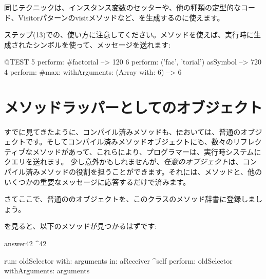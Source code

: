 \documentclass[a4paper,10pt,twoside]{book}
\begin{document}
同じテクニックは、インスタンス変数のセッターや、他の種類の定型的なコード、Visitorパターンのvisitメソッドなど、を生成するのに使えます。

ステップ(13)での、使い方に注意してください。メソッドを使えば、実行時に生成されたシンボルを使って、メッセージを送れます:
\begin{code}{@TEST}
5 perform: #factorial                                             --> 120
6 perform: ('fac', 'torial') asSymbol                       --> 720
4 perform: #max: withArguments: (Array with: 6) --> 6
\end{code}

\section{メソッドラッパーとしてのオブジェクト}

すでに見てきたように、コンパイル済みメソッドも、\st においては、普通のオブジェクトです。そしてコンパイル済みメソッドオブジェクトにも、数々のリフレクティブなメソッドがあって、これらにより、プログラマーは、実行時システムにクエリを送れます。
少し意外かもしれませんが、\emph{任意のオブジェクト}は、コンパイル済みメソッドの役割を担うことができます。それには、メソッドと、他のいくつかの重要なメッセージに応答するだけで済みます。 %


さてここで、普通の\st のオブジェクトを、このクラスのメソッド辞書に登録しましょう。


を見ると、以下のメソッドが見つかるはずです:
\begin{code}{}
answer42
	^42

run: oldSelector with: arguments in: aReceiver
	^self perform: oldSelector withArguments: arguments
\end{code}
\end{document}
